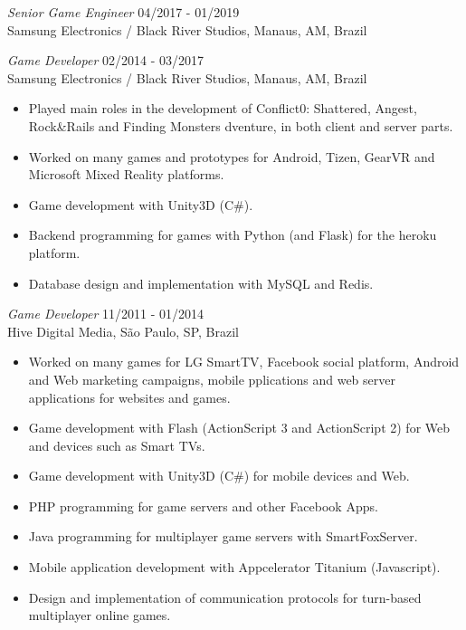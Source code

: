 \documentclass[line,margin]{res}
\begin{document}
\begin{resume}
        {\sl Senior Game Engineer} \hfill 04/2017 - 01/2019 \\
                Samsung Electronics / Black River Studios, Manaus, AM, Brazil

        {\sl Game Developer} \hfill 02/2014 - 03/2017 \\
                Samsung Electronics / Black River Studios, Manaus, AM, Brazil
        \begin{itemize}  \itemsep 1.25pt
                \item Played main roles in the development of Conflict0: Shattered, Angest, Rock\&Rails and Finding Monsters dventure, in both client and server parts.
                \item Worked on many games and prototypes for Android, Tizen, GearVR and Microsoft Mixed Reality platforms.
                \item Game development with Unity3D (C\#).
                \item Backend programming for games with Python (and Flask) for the heroku platform.
                \item Database design and implementation with MySQL and Redis.
        \end{itemize}
                 
        {\sl Game Developer} \hfill 11/2011 - 01/2014 \\
                Hive Digital Media, São Paulo, SP, Brazil
        \begin{itemize}  \itemsep 1.25pt
                \item Worked on many games for LG SmartTV, Facebook social platform, Android and Web marketing campaigns, mobile pplications and web server applications for websites and games.
                \item Game development with Flash (ActionScript 3 and ActionScript 2) for Web and devices such as Smart TVs.
 		\item Game development with Unity3D (C\#) for mobile devices and Web.
                \item PHP programming for game servers and other Facebook Apps.
                \item Java programming for multiplayer game servers with SmartFoxServer.
 		\item Mobile application development with Appcelerator Titanium (Javascript).
                \item Design and implementation of communication protocols for turn-based multiplayer online games.
        \end{itemize}
                 

\end{resume}
\end{document}
